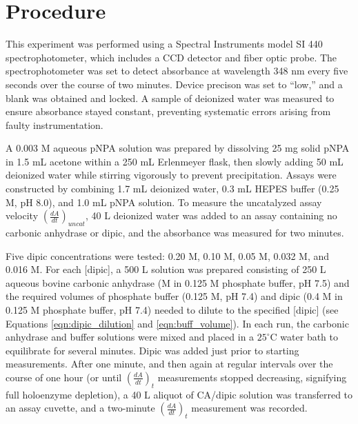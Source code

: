 \section{Procedure}
This experiment was performed using a Spectral Instruments model SI 440 spectrophotometer, which includes a CCD detector and fiber optic probe. The spectrophotometer was set to detect absorbance at wavelength 348 nm every five seconds over the course of two minutes. Device precison was set to ``low,'' and a blank was obtained and locked. A sample of deionized water was measured to ensure absorbance stayed constant, preventing systematic errors arising from faulty instrumentation.

A 0.003 M aqueous pNPA solution was prepared by dissolving 25 mg solid pNPA in 1.5 mL acetone within a 250 mL Erlenmeyer flask, then slowly adding 50 mL deionized water while stirring vigorously to prevent precipitation. Assays were constructed by combining 1.7 mL deionized water, 0.3 mL HEPES buffer (0.25 M, pH 8.0), and 1.0 mL pNPA solution. To measure the uncatalyzed assay velocity $\left( \frac{dA}{dt} \right)_{uncat}$, 40 {\textmu}L deionized water was added to an assay containing no carbonic anhydrase or dipic, and the absorbance was measured for two minutes.

Five dipic concentrations were tested: 0.20 M, 0.10 M, 0.05 M, 0.032 M, and 0.016 M. For each [dipic], a 500 {\textmu}L solution was prepared consisting of 250 {\textmu}L aqueous bovine carbonic anhydrase (\caconc M in 0.125 M phosphate buffer, pH 7.5) and the required volumes of phosphate buffer (0.125 M, pH 7.4) and dipic (0.4 M in 0.125 M phosphate buffer, pH 7.4) needed to dilute to the specified [dipic] (see Equations \eqref{eqn:dipic_dilution} and \eqref{eqn:buff_volume}). In each run, the carbonic anhydrase and buffer solutions were mixed and placed in a $25^{\circ}$C water bath to equilibrate for several minutes. Dipic was added just prior to starting measurements. After one minute, and then again at regular intervals over the course of one hour (or until $\left(\frac{dA}{dt}\right)_t$ measurements stopped decreasing, signifying full holoenzyme depletion), a 40 {\textmu}L aliquot of CA/dipic solution was transferred to an assay cuvette, and a two-minute $\left(\frac{dA}{dt}\right)_t$ measurement was recorded. 